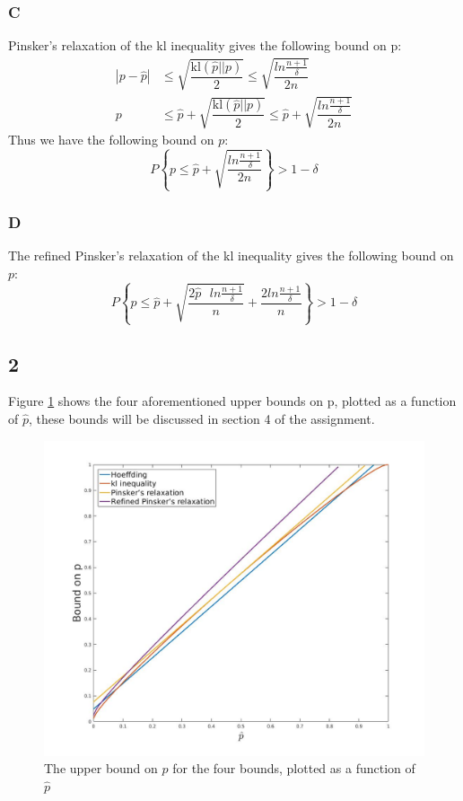 \documentclass{article}
\begin{document}
\subsubsection{C}
Pinsker's relaxation of the kl inequality gives the following bound on p:
\begin{align*}
|p - \hat{p}| &\leq \sqrt{\dfrac{\text{kl}(\hat{p}||p)}{2}} \leq \sqrt{\dfrac{ln \frac{n+1}{\delta}}{2n}} \\
p &\leq \hat{p} + \sqrt{\dfrac{\text{kl}(\hat{p}||p)}{2}} \leq \hat{p} + \sqrt{\dfrac{ln \frac{n+1}{\delta}}{2n}}
\end{align*}
Thus we have the following bound on $p$:
\begin{equation}
P \left\lbrace p \leq \hat{p} + \sqrt{\dfrac{ln \frac{n+1}{\delta}}{2n}} \right\rbrace > 1 - \delta
\end{equation}

\subsubsection{D}
The refined Pinsker's relaxation of the kl inequality gives the following bound on $p$:
\begin{equation}
P \left\lbrace p \leq \hat{p} + \sqrt{\dfrac{2 \hat{p} \text{ } ln \frac{n+1}{\delta}}{n}} + \dfrac{2 ln \frac{n+1}{\delta}}{n} \right\rbrace > 1 - \delta
\end{equation}
\subsection{2}
Figure \ref{fig:1} shows the four aforementioned upper bounds on p, plotted as a function of $\hat{p}$, these bounds will be discussed in section 4 of the assignment.
\begin{figure}[H]
  \centering
  \includegraphics[width=17cm]{fig/5.jpg}
  \caption{\footnotesize The upper bound on $p$ for the four bounds, plotted as a function of $\hat{p}$}
    \label{fig:1}
\end{figure}
\end{document}
